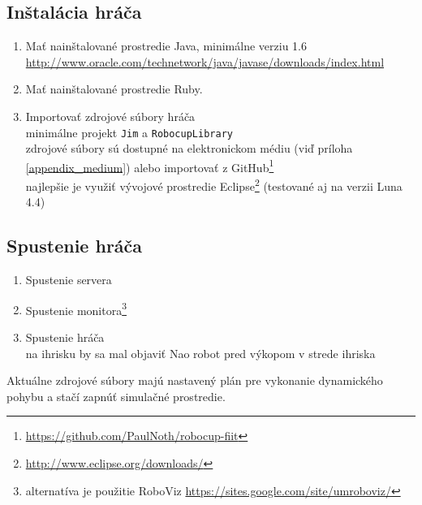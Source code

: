 \subsection{Inštalácia hráča}
\begin{enumerate}
	\item Mať nainštalované prostredie Java, minimálne verziu 1.6
	\\ \url{http://www.oracle.com/technetwork/java/javase/downloads/index.html}
	\item Mať nainštalované prostredie Ruby.
	\item Importovať zdrojové súbory hráča
	\\ minimálne projekt \texttt{Jim} a \texttt{RobocupLibrary}
	\\ zdrojové súbory sú dostupné na elektronickom médiu (viď príloha \ref{appendix_medium}) alebo importovať z GitHub\footnote{\url{https://github.com/PaulNoth/robocup-fiit}}
	\\ najlepšie je využiť vývojové prostredie Eclipse\footnote{\url{http://www.eclipse.org/downloads/}} (testované aj na verzii Luna 4.4)
\end{enumerate}

\subsection{Spustenie hráča}
\begin{enumerate}
	\item Spustenie servera
	\item Spustenie monitora\footnote{alternatíva je použitie RoboViz \url{https://sites.google.com/site/umroboviz/}}
	\item Spustenie hráča
	\\ na ihrisku by sa mal objaviť Nao robot pred výkopom v strede ihriska
\end{enumerate}
Aktuálne zdrojové súbory majú nastavený plán pre vykonanie dynamického pohybu a stačí zapnúť simulačné prostredie.